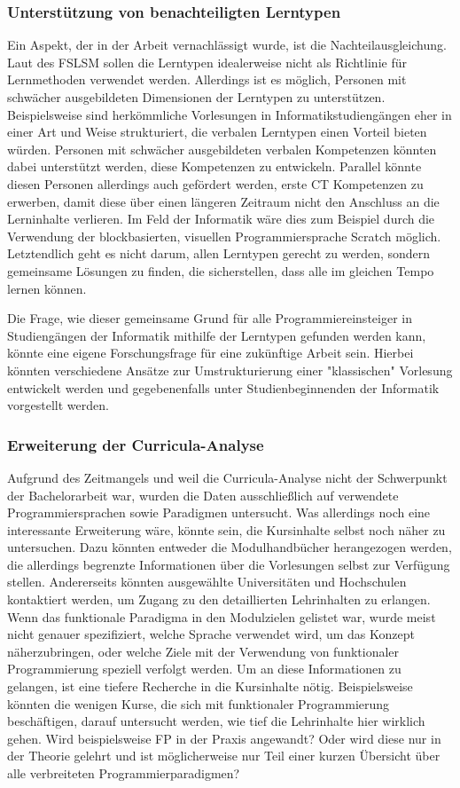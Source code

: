 \subsubsection{Unterstützung von benachteiligten Lerntypen}
Ein Aspekt, der in der Arbeit vernachlässigt wurde, ist die Nachteilausgleichung. Laut des FSLSM sollen die Lerntypen idealerweise nicht als Richtlinie für Lernmethoden verwendet werden. Allerdings ist es möglich, Personen mit schwächer ausgebildeten Dimensionen der Lerntypen zu unterstützen.
Beispielsweise sind herkömmliche Vorlesungen in Informatikstudiengängen eher in einer Art und Weise strukturiert, die verbalen Lerntypen einen Vorteil bieten würden. Personen mit schwächer ausgebildeten verbalen Kompetenzen könnten dabei unterstützt werden, diese Kompetenzen zu entwickeln. Parallel könnte diesen Personen allerdings auch gefördert werden, erste CT Kompetenzen zu erwerben, damit diese über einen längeren Zeitraum nicht den Anschluss an die Lerninhalte verlieren. Im Feld der Informatik wäre dies zum Beispiel durch die Verwendung der blockbasierten, visuellen Programmiersprache Scratch möglich.
Letztendlich geht es nicht darum, allen Lerntypen gerecht zu werden, sondern gemeinsame Lösungen zu finden, die sicherstellen, dass alle im gleichen Tempo lernen können.

Die Frage, wie dieser gemeinsame Grund für alle Programmiereinsteiger in Studiengängen der Informatik mithilfe der Lerntypen gefunden werden kann, könnte eine eigene Forschungsfrage für eine zukünftige Arbeit sein. Hierbei könnten verschiedene Ansätze zur Umstrukturierung einer "klassischen" Vorlesung entwickelt werden und gegebenenfalls unter Studienbeginnenden der Informatik vorgestellt werden.

\subsubsection{Erweiterung der Curricula-Analyse}
Aufgrund des Zeitmangels und weil die Curricula-Analyse nicht der Schwerpunkt der Bachelorarbeit war, wurden die Daten ausschließlich auf verwendete Programmiersprachen sowie Paradigmen untersucht. Was allerdings noch eine interessante Erweiterung wäre, könnte sein, die Kursinhalte selbst noch näher zu untersuchen. Dazu könnten entweder die Modulhandbücher herangezogen werden, die allerdings begrenzte Informationen über die Vorlesungen selbst zur Verfügung stellen. Andererseits könnten ausgewählte Universitäten und Hochschulen kontaktiert werden, um Zugang zu den detaillierten Lehrinhalten zu erlangen.
Wenn das funktionale Paradigma in den Modulzielen gelistet war, wurde meist nicht genauer spezifiziert, welche Sprache verwendet wird, um das Konzept näherzubringen, oder welche Ziele mit der Verwendung von funktionaler Programmierung speziell verfolgt werden. Um an diese Informationen zu gelangen, ist eine tiefere Recherche in die Kursinhalte nötig.
Beispielsweise könnten die wenigen Kurse, die sich mit funktionaler Programmierung beschäftigen, darauf untersucht werden, wie tief die Lehrinhalte hier wirklich gehen. Wird beispielsweise FP in der Praxis angewandt? Oder wird diese nur in der Theorie gelehrt und ist möglicherweise nur Teil einer kurzen Übersicht über alle verbreiteten Programmierparadigmen?


